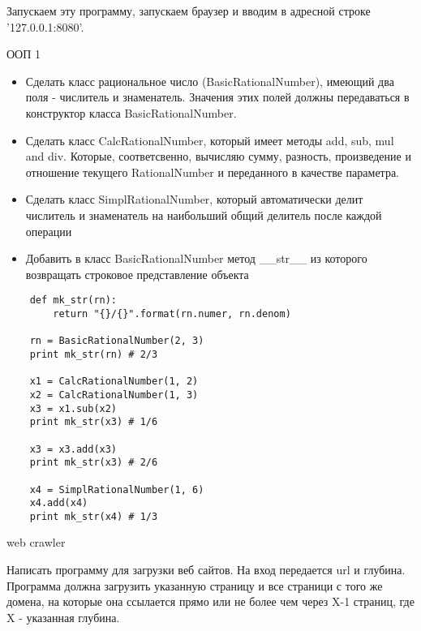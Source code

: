 \documentclass{article}
\begin{document}
Запускаем эту программу, запускаем браузер и вводим в адресной строке '127.0.0.1:8080'.

\newpage

\begin{center} ООП 1 \end{center}
\begin{itemize}
    \item Сделать класс рациональное число (BasicRationalNumber),
        имеющий два поля - числитель и знаменатель. Значения этих полей 
        должны передаваться в конструктор класса BasicRationalNumber.
    \item Сделать класс CalcRationalNumber, который имеет методы add,
        sub, mul and div. Которые, соответсвенно, вычисляю сумму, разность,
        произведение и отношение текущего RationalNumber и переданного в качестве 
        параметра.
    \item Сделать класс SimplRationalNumber, который автоматически делит
        числитель и знаменатель на наибольший общий делитель после каждой операции
    \item Добавить в класс BasicRationalNumber метод \_\_str\_\_ из которого возвращать
        строковое представление объекта
\end{itemize}

\begin{lstlisting}
    def mk_str(rn):
        return "{}/{}".format(rn.numer, rn.denom)

    rn = BasicRationalNumber(2, 3)
    print mk_str(rn) # 2/3

    x1 = CalcRationalNumber(1, 2)
    x2 = CalcRationalNumber(1, 3)
    x3 = x1.sub(x2)
    print mk_str(x3) # 1/6

    x3 = x3.add(x3)
    print mk_str(x3) # 2/6

    x4 = SimplRationalNumber(1, 6)
    x4.add(x4)
    print mk_str(x4) # 1/3
\end{lstlisting}
\newpage

\begin{center} web crawler \end{center}
Написать программу для загрузки веб сайтов. На вход передается url и глубина.
Программа должна загрузить указанную страницу и все страници с того же домена,
на которые она ссылается прямо или не более чем через X-1 страниц, где X - 
указанная глубина.
\newpage
\end{document}
